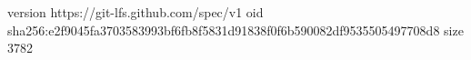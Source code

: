 version https://git-lfs.github.com/spec/v1
oid sha256:e2f9045fa3703583993bf6fb8f5831d91838f0f6b590082df9535505497708d8
size 3782
